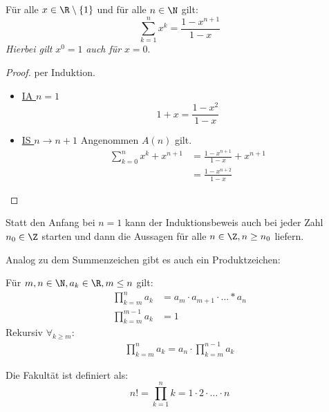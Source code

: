 \begin{theorem}
	Für alle $x \in \R \setminus \{1\}$ und für alle $n \in  \N$ gilt:
	\[
	\sum_{k=1}^{n}x^k = \frac{1-x^{n+1}}{1-x}
	\]
\emph{Hierbei gilt} $x^{0}=1$ \emph{auch für} $x=0$.
\end{theorem}
\begin{proof}
per Induktion.
\begin{itemize}[label=$\lozenge$, itemsep=2ex]
	\item \underline{IA $n=1$ }
		\[
		1+x = \frac{1-x^2}{1-x}
		\]
	\item \underline{IS $n \to n+1$}
		Angenommen $A(n)$ gilt.
		\begin{align*}
			\sum_{k=0}^{n}x^{k}+x^{n+1}&= \frac{1-x^{n+1}}{1-x}+x^{n+1}\\
						   &=\frac{1-x^{n+2}}{1-x}
		\end{align*}
\end{itemize}
\end{proof}
\begin{remark}
Statt den Anfang bei $n=1$ kann der Induktionsbeweis auch bei jeder Zahl $n_0 \in  \Z$ starten und dann die Aussagen für alle $n \in \Z, n\ge n_0$ liefern.  
\end{remark}
Analog zu dem Summenzeichen gibt es auch ein Produktzeichen:
\begin{notation}[Produktzeichen]
Für $m,n \in \N, a_k \in \R, m \le n$ gilt: 
\begin{align*}
	\prod_{k=m}^{n} a_k &= a_m \cdot a_{m+1} \cdot \ldots * a_n \\
\prod_{k=m}^{m-1}a_k &= 1 
\end{align*}
Rekursiv $\forall_{k\ge m}$:
\begin{align*}
	\prod_{k=m}^{n} a_k= a_n \cdot \prod_{k=m}^{n-1} a_k  
\end{align*}
\end{notation}
\begin{definition}[Fakultät]
	Die Fakultät ist definiert als:
	\[
	n! = \prod_{k=1}^{n} k = 1 \cdot 2 \cdot \ldots \cdot n 
	\]
\end{definition}

